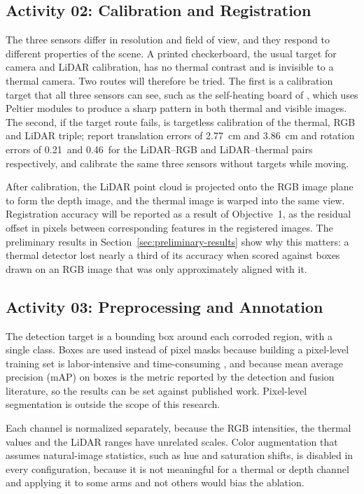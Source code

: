 \subsection{Activity 02: Calibration and Registration}
\label{sec:registration}

The three sensors differ in resolution and field of view, and they respond to
different properties of the scene. A printed checkerboard, the usual target for
camera and LiDAR calibration, has no thermal contrast and is invisible to a
thermal camera. Two routes will therefore be tried. The first is a calibration
target that all three sensors can see, such as the self-heating board of
\citet{Nooralishahi2022}, which uses Peltier modules to produce a sharp pattern
in both thermal and visible images. The second, if the target route fails, is
targetless calibration of the thermal, RGB and LiDAR triple; \citet{Yang2024}
report translation errors of 2.77~cm and 3.86~cm and rotation errors of
0.21\textdegree\ and 0.46\textdegree\ for the LiDAR--RGB and LiDAR--thermal pairs
respectively, and \citet{Tran2024} calibrate the same three sensors without
targets while moving.

After calibration, the LiDAR point cloud is projected onto the RGB image plane to
form the depth image, and the thermal image is warped into the same view.
Registration accuracy will be reported as a result of Objective~1, as the
residual offset in pixels between corresponding features in the registered
images. The preliminary results in Section~\ref{sec:preliminary-results} show
why this matters: a thermal detector lost nearly a third of its accuracy when
scored against boxes drawn on an RGB image that was only approximately aligned
with it.

\subsection{Activity 03: Preprocessing and Annotation}
\label{sec:annotation}

The detection target is a bounding box around each corroded region, with a
single class. Boxes are used instead of pixel masks because building a
pixel-level training set is labor-intensive and time-consuming \citep{Lim2021},
and because mean average precision (mAP) on boxes is the metric reported by the
detection and fusion literature, so the results can be set against published
work. Pixel-level segmentation is outside the scope of this research.

Each channel is normalized separately, because the RGB intensities, the thermal
values and the LiDAR ranges have unrelated scales. Color augmentation that
assumes natural-image statistics, such as hue and saturation shifts, is disabled
in every configuration, because it is not meaningful for a thermal or depth
channel and applying it to some arms and not others would bias the ablation.

